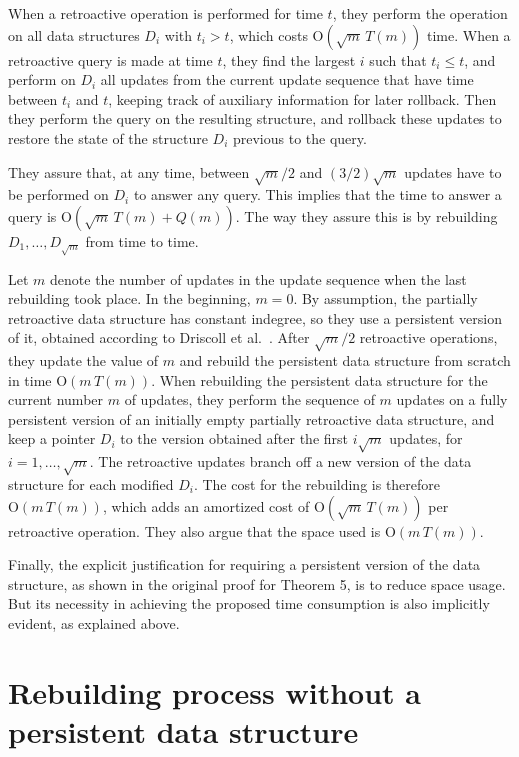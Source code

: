 \documentclass[reqno,11pt]{amsart}
\newcommand{\Oh}{\mathrm{O}}
\begin{document}
When a retroactive operation is performed for time $t$, they perform the operation 
on all data structures $D_i$ with $t_i>t$, which costs $\Oh(\sqrt{m}\,T(m))$ time.  
When a retroactive query is made at time $t$, they find the largest $i$ such that 
$t_i \leq t$, and perform on $D_i$ all updates from the current update sequence that 
have time between $t_i$ and $t$, keeping track of auxiliary information for later rollback. 
Then they perform the query on the resulting structure, and rollback these 
updates to restore the state of the structure $D_i$ previous to the query.

They assure that, at any time, between $\sqrt{m}/2$ and $(3/2)\sqrt{m}$ 
updates have to be performed on $D_i$ to answer any query.  
This implies that the time to answer a query is $\Oh(\sqrt{m}\,T(m)+Q(m))$.  
The way they assure this is by rebuilding $D_1,\ldots,D_{\sqrt{m}}$ from time to time. 

Let $m$ denote the number of updates in the update sequence when the last rebuilding took place.
In the beginning, $m=0$. 
By assumption, the partially retroactive data structure has constant indegree, so they use 
a persistent version of it, obtained according to Driscoll et al.~\cite{DriscollSST1989}.
After $\sqrt{m}/2$ retroactive operations, they update the value of $m$ and 
rebuild the persistent data structure from scratch in time $\Oh(m\,T(m))$. 
When rebuilding the persistent data structure for the current number $m$ of updates, 
they perform the sequence of $m$ updates on a fully persistent version of an 
initially empty partially retroactive data structure, and keep a pointer $D_i$ 
to the version obtained after the first $i\sqrt{m}$ updates, for $i = 1,\ldots,\sqrt{m}$. 
The retroactive updates branch off 
a new version of the data structure for each modified $D_i$.  
The cost for the rebuilding is therefore $\Oh(m\,T(m))$, 
which adds an amortized cost of $\Oh(\sqrt{m}\,T(m))$ per retroactive operation. 
They also argue that the space used is $\Oh(m\,T(m))$.

Finally, the explicit justification for requiring a persistent version of the data structure, 
as shown in the original proof for Theorem 5, is to reduce space usage. But its necessity in 
achieving the proposed time consumption is also implicitly evident, as explained above.

\section{Rebuilding process without a persistent data structure}\label{sec:rebuilding}
\end{document}
